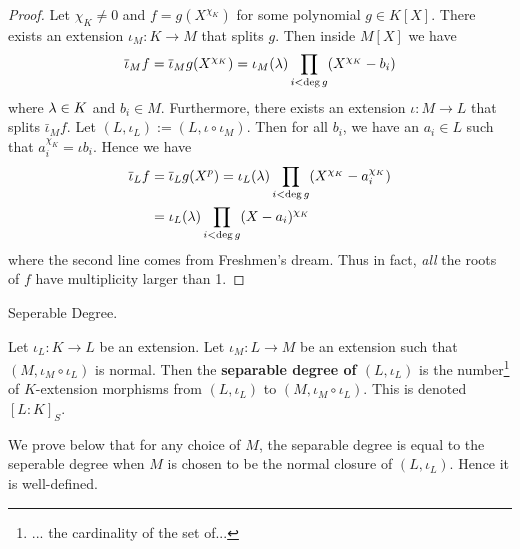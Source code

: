\documentclass[../book.tex]{subfiles}
\begin{document}
\begin{proof}
        Let $\chi_K \neq 0$ and $f = g(X^{\chi_K})$
        for some polynomial $g \in K[X]$.
        There exists an extension $\iota_M : K \to M$ that splits $g$. 
        Then inside $M[X]$ we have \[
            \overline{\iota}_M f = \overline{\iota}_M g(X^{\chi_K})
            = \iota_M(\lambda) \prod_{i < \deg g} (X^{\chi_K} - b_i)
        \]
        where $\lambda \in K$ and $b_i \in M$. 
        Furthermore, there exists an extension $\iota : M \to L$ 
        that splits $\bar\iota_M f$.
        Let $(L,\iota_L) := (L,\iota\circ\iota_M)$. 
        Then for all $b_i$, we have an $a_i \in L$ such that $a_i^{\chi_K} = \iota b_i$. 
        Hence we have \begin{align*}
            \overline{\iota}_L f &= \overline{\iota}_L g(X^p) 
            = \iota_L(\lambda) \prod_{i < \deg g}  (X^{\chi_K} - a_i^{\chi_K}) \\
            &= \iota_L(\lambda) \prod_{i < \deg g}  (X - a_i)^{\chi_K}  
        \end{align*}
        where the second line comes from Freshmen's dream. 
        Thus in fact, \emph{all} the roots of $f$ have multiplicity larger than 1. 
\end{proof}
\begin{dfn} Seperable Degree. 
    
    Let $\iota_L : K \to L$ be an extension. 
    Let $\iota_M : L \to M$ be an extension such that 
    $(M,\iota_M\circ\iota_L)$ is normal. 
    Then the \textbf{separable degree of $(L,\iota_L)$} is
    the number\footnote{... the cardinality of the set of...}
    of $K$-extension morphisms 
    from $(L,\iota_L)$ to $(M,\iota_M\circ\iota_L)$.
    This is denoted $[L : K]_S$. 
    
    We prove below that for any choice of $M$,
    the separable degree is equal to the seperable degree 
    when $M$ is chosen to be the normal closure of $(L,\iota_L)$.
    Hence it is well-defined.
\end{dfn}
\end{document}
